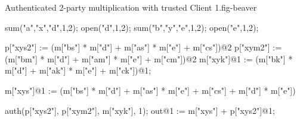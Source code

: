 \begin{fpfig}[t]{Authenticated 2-party multiplication with trusted Client 1.}{fig-beaver}
{\footnotesize
  \begin{verbatimtab}
sum("a","x","d",1,2);
open("d",1,2);
sum("b","y","e",1,2);
open("e",1,2);

p["xys2"] := (m["bs"] * m["d"] + m["as"] * m["e"] + m["cs"])@2
p["xym2"] := (m["bm"] * m["d"] + m["am"] * m["e"] + m["cm"])@2
m["xyk"]@1 := (m["bk"] * m["d"] + m["ak"] * m["e"] + m["ck"])@1;

m["xys"]@1 := (m["bs"] * m["d"] + m["as"] * m["e"] + m["cs"] +
               m["d"] * m["e"])

auth(p["xys2"], p["xym2"], m["xyk"], 1);
out@1 := m["xys"] + p["xys2"]@1;
\end{verbatimtab}
}
\end{fpfig}

\begin{comment}

\begin{fpfig}[t]{Authenticated 2-Party Multiplication.}{fig-beaver}
{\footnotesize
  \begin{verbatimtab}
    secopen("a","x","d",1,2);
    secopen("a","x","d",2,1);
    secopen("b","y","e",1,2);
    secopen("b","y","e",2,1);
    let xys =
      macsum(macctimes(macshare("b"), m["d"]),
             macsum(macctimes(macshare("a"), m["e"]),
                    macshare("c")))
    in
    let xyk = mack("b") * m["d"] + mack("a") * m["d"] + mack("c")               
    in
    secreveal(xys,xyk,"1",1,2);
    secreveal(maccsum(xys,m["d"] * m["e"]),
              xyk - m["d"] * m["e"],
              "2",2,1);
    out@1 := (p[1] + p[2])@1;
    out@2 := (p[1] + p[2])@2;
  \end{verbatimtab}
}
\end{fpfig}

\end{comment}
